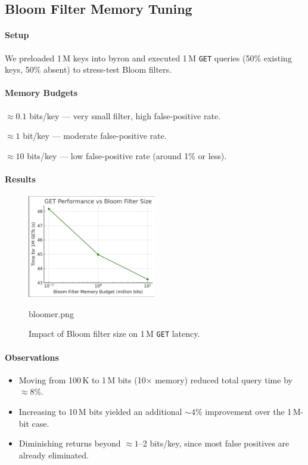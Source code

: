 \documentclass[10pt]{article}
\begin{document}
\subsection{Bloom Filter Memory Tuning}

\paragraph{Setup}
We preloaded 1\,M keys into byron and executed 1\,M \texttt{GET} queries (50\% existing keys, 50\% absent) to stress-test Bloom filters.

\paragraph{Memory Budgets}
\begin{description}[leftmargin=1em,labelwidth=*,itemsep=0.5ex]
  \item[100\,K bits] $\approx0.1$ bits/key — very small filter, high false-positive rate.
  \item[1\,M bits] $\approx1$ bit/key — moderate false-positive rate.
  \item[10\,M bits] $\approx10$ bits/key — low false-positive rate (around 1\% or less).
\end{description}

\paragraph{Results}
\begin{figure}[htbp]
  \centering
  \includegraphics[width=0.5\textwidth]{bloomer.png}
  \caption{Impact of Bloom filter size on 1\,M \texttt{GET} latency.}
  \label{fig:bloom_tuning}bloomer.png
\end{figure}

\paragraph{Observations}
\begin{itemize}[itemsep=0.5ex]
  \item Moving from 100\,K to 1\,M bits (10× memory) reduced total query time by $\approx8\%$.
  \item Increasing to 10\,M bits yielded an additional $\sim4\%$ improvement over the 1\,M-bit case.
  \item Diminishing returns beyond \(\approx1\)–2 bits/key, since most false positives are already eliminated.
\end{itemize}
\end{document}
